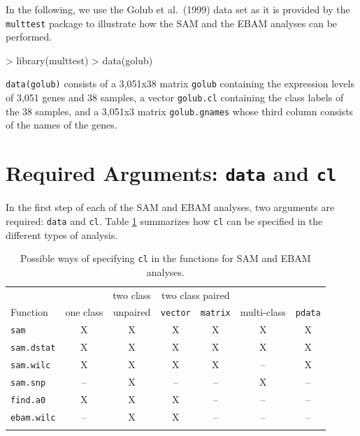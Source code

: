 \documentclass[a4paper]{article}
\begin{document}
In the following, we use the Golub et al.\ (1999) data set as it
is provided by the \texttt{multtest} package to illustrate how the
SAM and the EBAM analyses can be performed.

\begin{Schunk}
\begin{Sinput}
> library(multtest)
> data(golub)
\end{Sinput}
\end{Schunk}


\texttt{data(golub)} consists of a 3,051x38 matrix \texttt{golub}
containing the expression levels of 3,051 genes and 38 samples, a
vector \texttt{golub.cl} containing the class labels of the 38
samples, and a 3,051x3 matrix \texttt{golub.gnames} whose third
column consists of the names of the genes.

\section{Required Arguments: \texttt{data} and \texttt{cl}}

In the first step of each of the SAM and EBAM analyses,
two arguments are required: \texttt{data} and \texttt{cl}. Table \ref{tab:cl}
summarizes how \texttt{cl} can be specified in the different types of analysis.



\begin{table}[!hb]
\vspace*{8pt}
\centering \caption{Possible ways of specifying \texttt{cl} in the
functions for SAM and EBAM analyses.}\label{tab:cl}
\vspace*{8pt}
\begin{tabular}{l c c c c c c}
\hline\hline
&&two class&\multicolumn{2}{c}{two class paired}&&\\[-4pt]
Function&one class&unpaired&\texttt{vector}&\texttt{matrix}&multi-class&\texttt{pdata}\\
\hline
\texttt{sam}&X&X&X&X&X&X\\
\texttt{sam.dstat}&X&X&X&X&X&X\\
\texttt{sam.wilc}&X&X&X&X&--&X\\
\texttt{sam.snp}&--&X&--&--&X&--\\
\texttt{find.a0}&X&X&X&--&--&--\\
\texttt{ebam.wilc}&--&X&X&--&--&--\\ \hline\hline
\vspace*{4pt}
\end{tabular}
\end{table}
\end{document}
